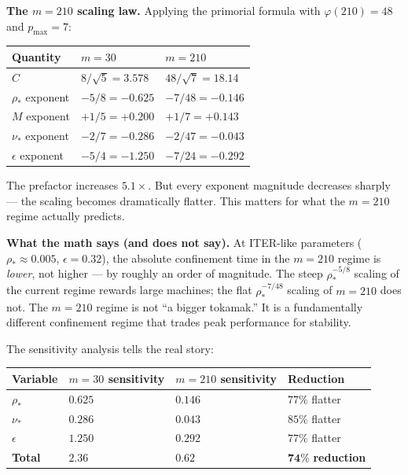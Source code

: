 \documentclass[11pt,letterpaper]{article}
\theoremstyle{definition}
\begin{document}
\medskip
\textbf{The $m = 210$ scaling law.} Applying the primorial formula with $\varphi(210) = 48$ and $p_{\text{max}} = 7$:

\begin{center}
\begin{tabular}{@{}lll@{}}
\toprule
Quantity & $m = 30$ & $m = 210$ \\
\midrule
$C$                 & $8/\sqrt{5} = 3.578$  & $48/\sqrt{7} = 18.14$  \\
$\rho_*$ exponent   & $-5/8 = -0.625$       & $-7/48 = -0.146$       \\
$M$ exponent        & $+1/5 = +0.200$       & $+1/7 = +0.143$        \\
$\nu_*$ exponent    & $-2/7 = -0.286$       & $-2/47 = -0.043$       \\
$\epsilon$ exponent & $-5/4 = -1.250$       & $-7/24 = -0.292$       \\
\bottomrule
\end{tabular}
\end{center}

The prefactor increases $5.1\times$. But every exponent magnitude decreases sharply --- the scaling becomes dramatically flatter. This matters for what the $m = 210$ regime actually predicts.

\medskip
\textbf{What the math says (and does not say).} At ITER-like parameters ($\rho_* \approx 0.005$, $\epsilon = 0.32$), the absolute confinement time in the $m = 210$ regime is \emph{lower}, not higher --- by roughly an order of magnitude. The steep $\rho_*^{-5/8}$ scaling of the current regime rewards large machines; the flat $\rho_*^{-7/48}$ scaling of $m = 210$ does not. The $m = 210$ regime is not ``a bigger tokamak.'' It is a fundamentally different confinement regime that trades peak performance for stability.

The sensitivity analysis tells the real story:

\begin{center}
\begin{tabular}{@{}llll@{}}
\toprule
Variable & $m = 30$ sensitivity & $m = 210$ sensitivity & Reduction \\
\midrule
$\rho_*$   & $0.625$ & $0.146$ & $77\%$ flatter \\
$\nu_*$    & $0.286$ & $0.043$ & $85\%$ flatter \\
$\epsilon$ & $1.250$ & $0.292$ & $77\%$ flatter \\
\textbf{Total} & $\mathbf{2.36}$ & $\mathbf{0.62}$ & $\mathbf{74\%}$ \textbf{reduction} \\
\bottomrule
\end{tabular}
\end{center}
\end{document}
